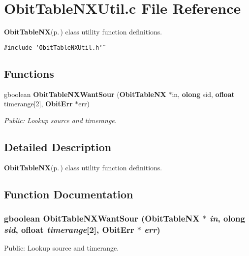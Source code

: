 \section{Obit\-Table\-NXUtil.c File Reference}
\label{ObitTableNXUtil_8c}
{\bf Obit\-Table\-NX}{\rm (p.\,\pageref{structObitTableNX})} class utility function definitions. 

{\tt \#include \char`\"{}Obit\-Table\-NXUtil.h\char`\"{}}\par
\subsection*{Functions}
\begin{CompactItemize}
\item 
gboolean {\bf Obit\-Table\-NXWant\-Sour} ({\bf Obit\-Table\-NX} $\ast$in, {\bf olong} sid, {\bf ofloat} timerange[2], {\bf Obit\-Err} $\ast$err)
\begin{CompactList}\small\item\em Public: Lookup source and timerange. \item\end{CompactList}\end{CompactItemize}


\subsection{Detailed Description}
{\bf Obit\-Table\-NX}{\rm (p.\,\pageref{structObitTableNX})} class utility function definitions. 



\subsection{Function Documentation}
\subsubsection{\setlength{\rightskip}{0pt plus 5cm}gboolean Obit\-Table\-NXWant\-Sour ({\bf Obit\-Table\-NX} $\ast$ {\em in}, {\bf olong} {\em sid}, {\bf ofloat} {\em timerange}[2], {\bf Obit\-Err} $\ast$ {\em err})}\label{ObitTableNXUtil_8c_a0}


Public: Lookup source and timerange. 

